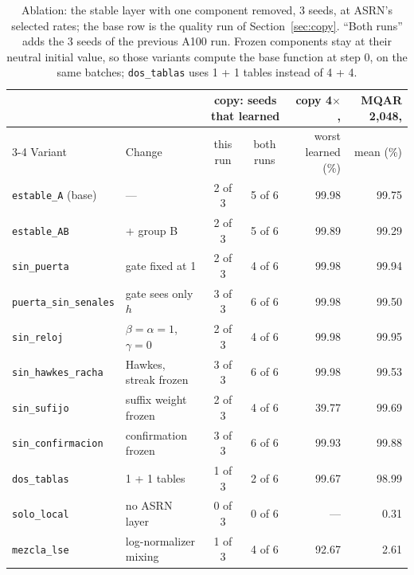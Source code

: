 \documentclass[11pt]{article}
\begin{document}
\begin{table}[t]
\centering\small
\setlength{\tabcolsep}{3pt}
\begin{tabular}{llccrr}
\toprule
& & \multicolumn{2}{c}{copy: seeds that learned} & copy 4$\times$, & MQAR 2{,}048,\\
\cmidrule(lr){3-4}
Variant & Change & this run & both runs & worst learned (\%) & mean (\%)\\
\midrule
\texttt{estable\_A} (base) & --- & 2 of 3 & 5 of 6 & 99.98 & 99.75\\
\texttt{estable\_AB} & + group B & 2 of 3 & 5 of 6 & 99.89 & 99.29\\
\texttt{sin\_puerta} & gate fixed at 1 & 2 of 3 & 4 of 6 & 99.98 & 99.94\\
\texttt{puerta\_sin\_senales} & gate sees only $h$ & 3 of 3 & 6 of 6 & 99.98 & 99.50\\
\texttt{sin\_reloj} & $\beta=\alpha=1$, $\gamma=0$ & 2 of 3 & 4 of 6 & 99.98 & 99.95\\
\texttt{sin\_hawkes\_racha} & Hawkes, streak frozen & 3 of 3 & 6 of 6 & 99.98 & 99.53\\
\texttt{sin\_sufijo} & suffix weight frozen & 2 of 3 & 4 of 6 & 39.77 & 99.69\\
\texttt{sin\_confirmacion} & confirmation frozen & 3 of 3 & 6 of 6 & 99.93 & 99.88\\
\texttt{dos\_tablas} & 1 + 1 tables & 1 of 3 & 2 of 6 & 99.67 & 98.99\\
\texttt{solo\_local} & no ASRN layer & 0 of 3 & 0 of 6 & --- & 0.31\\
\texttt{mezcla\_lse} & log-normalizer mixing & 1 of 3 & 4 of 6 & 92.67 & 2.61\\
\bottomrule
\end{tabular}
\caption{Ablation: the stable layer with one component removed, 3 seeds, at ASRN's selected rates; the base row is the
quality run of Section~\ref{sec:copy}. ``Both runs'' adds the 3 seeds of the previous A100 run. Frozen components stay
at their neutral initial value, so those variants compute the base function at step 0, on the same batches;
\texttt{dos\_tablas} uses 1 + 1 tables instead of 4 + 4.}
\label{tab:ablation}
\end{table}
\end{document}
